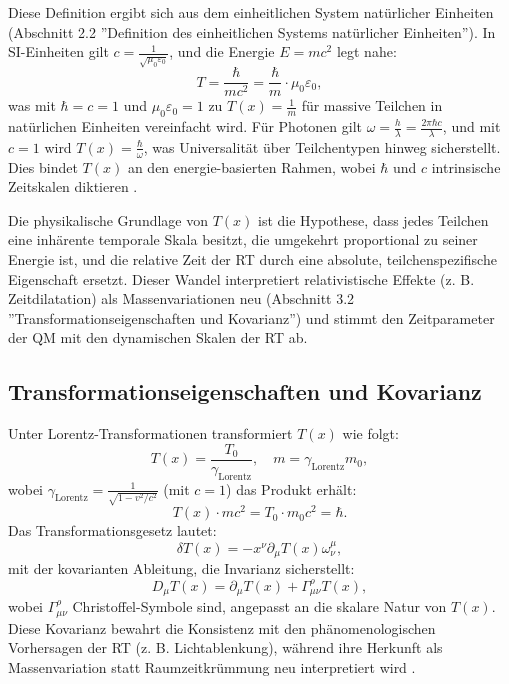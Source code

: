 \documentclass[12pt,a4paper]{article}
\newcommand{\Tfield}{T(x)}
\newcommand{\Tzero}{T_0}
\newcommand{\gammaf}{\gamma_{\text{Lorentz}}}
\begin{document}
	Diese Definition ergibt sich aus dem einheitlichen System natürlicher Einheiten (Abschnitt 2.2 ''Definition des einheitlichen Systems natürlicher Einheiten''). In SI-Einheiten gilt \(c = \frac{1}{\sqrt{\mu_0\varepsilon_0}}\), und die Energie \(E = mc^2\) legt nahe:
	\begin{equation}
		T = \frac{\hbar}{mc^2} = \frac{\hbar}{m} \cdot \mu_0\varepsilon_0,
		\label{eq:time_em}
	\end{equation}
	was mit \(\hbar = c = 1\) und \(\mu_0\varepsilon_0 = 1\) zu \(\Tfield = \frac{1}{m}\) für massive Teilchen in natürlichen Einheiten vereinfacht wird. Für Photonen gilt \(\omega = \frac{h}{\lambda} = \frac{2\pi\hbar c}{\lambda}\), und mit \(c = 1\) wird \(\Tfield = \frac{\hbar}{\omega}\), was Universalität über Teilchentypen hinweg sicherstellt. Dies bindet \(\Tfield\) an den energie-basierten Rahmen, wobei \(\hbar\) und \(c\) intrinsische Zeitskalen diktieren \cite{pascher_lagrange_2025}.
	
	Die physikalische Grundlage von \(\Tfield\) ist die Hypothese, dass jedes Teilchen eine inhärente temporale Skala besitzt, die umgekehrt proportional zu seiner Energie ist, und die relative Zeit der RT durch eine absolute, teilchenspezifische Eigenschaft ersetzt. Dieser Wandel interpretiert relativistische Effekte (z. B. Zeitdilatation) als Massenvariationen neu (Abschnitt 3.2 ''Transformationseigenschaften und Kovarianz'') und stimmt den Zeitparameter der QM mit den dynamischen Skalen der RT ab.
	
	\subsection{Transformationseigenschaften und Kovarianz}
	\label{subsec:transformations}
	
	Unter Lorentz-Transformationen transformiert \(\Tfield\) wie folgt:
	\begin{equation}
		\Tfield = \frac{\Tzero}{\gammaf}, \quad m = \gammaf m_0,
		\label{eq:transform}
	\end{equation}
	wobei \(\gammaf = \frac{1}{\sqrt{1 - v^2/c^2}}\) (mit \(c = 1\)) das Produkt erhält:
	\begin{equation}
		\Tfield \cdot m c^2 = \Tzero \cdot m_0 c^2 = \hbar.
		\label{eq:invariant_product}
	\end{equation}
	Das Transformationsgesetz lautet:
	\begin{equation}
		\delta\Tfield = -x^{\nu}\partial_{\mu}\Tfield\omega_{\nu}^{\mu},
		\label{eq:lorentz_transform}
	\end{equation}
	mit der kovarianten Ableitung, die Invarianz sicherstellt:
	\begin{equation}
		D_{\mu}\Tfield = \partial_{\mu}\Tfield + \Gamma_{\mu\nu}^{\rho}\Tfield,
		\label{eq:covariant_derivative}
	\end{equation}
	wobei \(\Gamma_{\mu\nu}^{\rho}\) Christoffel-Symbole sind, angepasst an die skalare Natur von \(\Tfield\). Diese Kovarianz bewahrt die Konsistenz mit den phänomenologischen Vorhersagen der RT (z. B. Lichtablenkung), während ihre Herkunft als Massenvariation statt Raumzeitkrümmung neu interpretiert wird \cite{pascher_lagrange_2025}.
	
\end{document}
